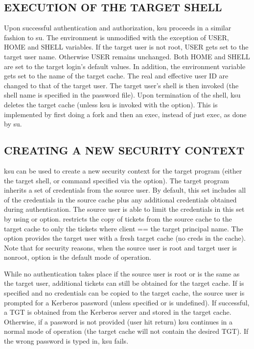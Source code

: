 \documentclass[letterpaper,10pt,english]{sphinxmanual}
\begin{document}
\subsection{EXECUTION OF THE TARGET SHELL}
\label{\detokenize{user/user_commands/ksu:execution-of-the-target-shell}}
\sphinxAtStartPar
Upon successful authentication and authorization, ksu proceeds in a
similar fashion to su.  The environment is unmodified with the
exception of USER, HOME and SHELL variables.  If the target user is
not root, USER gets set to the target user name.  Otherwise USER
remains unchanged.  Both HOME and SHELL are set to the target login’s
default values.  In addition, the environment variable 
gets set to the name of the target cache.  The real and effective user
ID are changed to that of the target user.  The target user’s shell is
then invoked (the shell name is specified in the password file).  Upon
termination of the shell, ksu deletes the target cache (unless ksu is
invoked with the  option).  This is implemented by first doing a
fork and then an exec, instead of just exec, as done by su.


\subsection{CREATING A NEW SECURITY CONTEXT}
\label{\detokenize{user/user_commands/ksu:creating-a-new-security-context}}
\sphinxAtStartPar
ksu can be used to create a new security context for the target
program (either the target shell, or command specified via the 
option).  The target program inherits a set of credentials from the
source user.  By default, this set includes all of the credentials in
the source cache plus any additional credentials obtained during
authentication.  The source user is able to limit the credentials in
this set by using  or  option.   restricts the copy
of tickets from the source cache to the target cache to only the
tickets where client == the target principal name.  The  option
provides the target user with a fresh target cache (no creds in the
cache).  Note that for security reasons, when the source user is root
and target user is non\sphinxhyphen{}root,  option is the default mode of
operation.

\sphinxAtStartPar
While no authentication takes place if the source user is root or is
the same as the target user, additional tickets can still be obtained
for the target cache.  If  is specified and no credentials can
be copied to the target cache, the source user is prompted for a
Kerberos password (unless  specified or 
is undefined).  If successful, a TGT is obtained from the Kerberos
server and stored in the target cache.  Otherwise, if a password is
not provided (user hit return) ksu continues in a normal mode of
operation (the target cache will not contain the desired TGT).  If the
wrong password is typed in, ksu fails.
\end{document}
